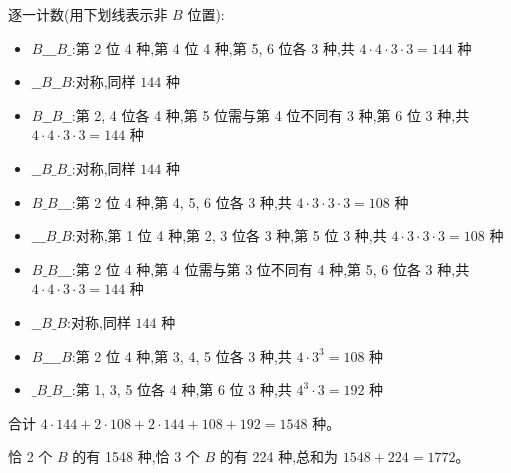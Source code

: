\begin{questions}
\begin{parts}
\begin{solution}
        逐一计数(用下划线表示非 $B$ 位置):
        \begin{itemize}
            \item $B\_\_\_B\_$:第 2 位 4 种,第 4 位 4 种,第 5, 6 位各 3 种,共 $4 \cdot 4 \cdot 3 \cdot 3 = 144$ 种
            \item $\_\_B\_\_B$:对称,同样 $144$ 种
            \item $B\_\_B\_\_$:第 2, 4 位各 4 种,第 5 位需与第 4 位不同有 3 种,第 6 位 3 种,共 $4 \cdot 4 \cdot 3 \cdot 3 = 144$ 种
            \item $\_\_B\_B\_$:对称,同样 $144$ 种
            \item $B\_B\_\_\_$:第 2 位 4 种,第 4, 5, 6 位各 3 种,共 $4 \cdot 3 \cdot 3 \cdot 3 = 108$ 种
            \item $\_\_\_B\_B$:对称,第 1 位 4 种,第 2, 3 位各 3 种,第 5 位 3 种,共 $4 \cdot 3 \cdot 3 \cdot 3 = 108$ 种
            \item $B\_B\_\_\_$:第 2 位 4 种,第 4 位需与第 3 位不同有 4 种,第 5, 6 位各 3 种,共 $4 \cdot 4 \cdot 3 \cdot 3 = 144$ 种
            \item $\_\_B\_B$:对称,同样 $144$ 种
            \item $B\_\_\_\_B$:第 2 位 4 种,第 3, 4, 5 位各 3 种,共 $4 \cdot 3^3 = 108$ 种
            \item $\_B\_B\_\_$:第 1, 3, 5 位各 4 种,第 6 位 3 种,共 $4^3 \cdot 3 = 192$ 种
        \end{itemize}
        合计 $4 \cdot 144 + 2 \cdot 108 + 2 \cdot 144 + 108 + 192 = 1548$ 种。

        恰 2 个 $B$ 的有 1548 种,恰 3 个 $B$ 的有 224 种,总和为 $1548 + 224 = 1772$。
    \end{solution}
    \end{parts}



\end{questions}
